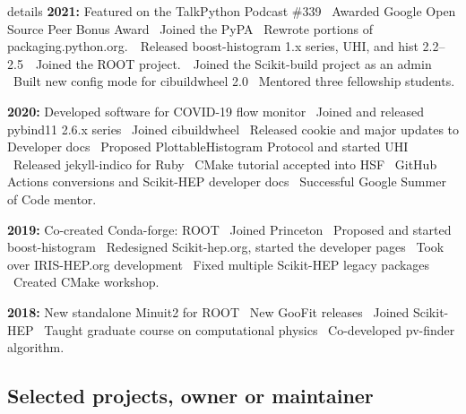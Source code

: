 \documentclass[10pt,letterpaper]{moderncv}
\begin{document}
\begin{taggedblock}{details}
\textbf{2021:}
Featured on the TalkPython Podcast \#339 \textbullet\
Awarded Google Open Source Peer Bonus Award \textbullet\
Joined the PyPA \textbullet\ Rewrote portions of packaging.python.org.\ \textbullet\
Released boost-histogram 1.x series, UHI, and hist 2.2--2.5\ \textbullet\
Joined the ROOT project.\ \textbullet\
Joined the Scikit-build project as an admin \textbullet\
Built new config mode for cibuildwheel 2.0 \textbullet\
Mentored three fellowship students.

\textbf{2020:}
Developed software for COVID-19 flow monitor \textbullet\
Joined and released pybind11 2.6.x series \textbullet\
Joined cibuildwheel \textbullet\
Released cookie and major updates to Developer docs \textbullet\
Proposed PlottableHistogram Protocol and started UHI \textbullet\
Released jekyll-indico for Ruby \textbullet\
CMake tutorial accepted into HSF \textbullet\
GitHub Actions conversions and Scikit-HEP developer docs \textbullet\
Successful Google Summer of Code mentor.

\textbf{2019:}
Co-created Conda-forge: ROOT \textbullet\
Joined Princeton \textbullet\
Proposed and started boost-histogram \textbullet\
Redesigned Scikit-hep.org, started the developer pages \textbullet\
Took over IRIS-HEP.org development \textbullet\
Fixed multiple Scikit-HEP legacy packages \textbullet\ Created CMake workshop.

\textbf{2018:} New standalone Minuit2 for ROOT \textbullet\
New GooFit releases \textbullet\
Joined Scikit-HEP \textbullet\
Taught graduate course on computational physics \textbullet\
Co-developed pv-finder algorithm.
\end{taggedblock}

\mysection{Open Source contributions}


\subsection{Selected projects, owner or maintainer}
\end{document}
